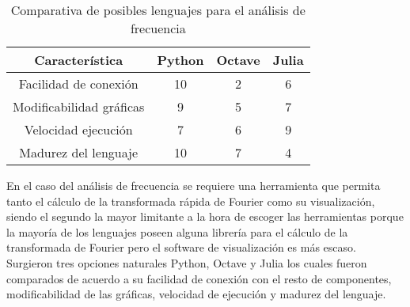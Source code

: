     \begin{table}[ht]
        \caption[Comparativa de posibles lenguajes para el análisis de frecuencia]{Comparativa de posibles lenguajes para el análisis de frecuencia}
        \label{tab:LenguajesAnalisisFrecuencia}
        \begin{center}
            \vspace{0.3cm}
            \begin{tabular}{|c|c|c|c|}
                \hline
                Característica              & Python & Octave & Julia\\\hline
                \hline
                Facilidad de conexión       & 10    & 2     & 6 \\\hline
                Modificabilidad gráficas    & 9     & 5     & 7 \\\hline
                Velocidad ejecución         & 7     & 6     & 9 \\\hline
                Madurez del lenguaje        & 10    & 7     & 4 \\\hline
            \end{tabular}
        \end{center}
    \end{table}

    En el caso del análisis de frecuencia se requiere una herramienta que
    permita tanto el cálculo de la transformada rápida de Fourier como su
    visualización, siendo el segundo la mayor limitante a la hora de escoger
    las herramientas porque la mayoría de los lenguajes poseen alguna librería
    para el cálculo de la transformada de Fourier pero el software de
    visualización es más escaso. Surgieron tres opciones naturales Python,
    Octave y Julia los cuales fueron comparados de acuerdo a su facilidad de
    conexión con el resto de componentes, modificabilidad de las gráficas,
    velocidad de ejecución y madurez del lenguaje.
